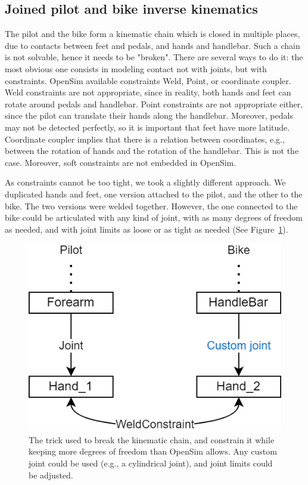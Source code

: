 \subsection{Joined pilot and bike inverse kinematics}
The pilot and the bike form a kinematic chain which is closed in multiple places, due to contacts between feet and pedals, and hands and handlebar. Such a chain is not solvable, hence it needs to be "broken". There are several ways to do it: the most obvious one consists in modeling contact not with joints, but with constraints. OpenSim available constraints Weld, Point, or coordinate coupler. Weld constraints are not appropriate, since in reality, both hands and feet can rotate around pedals and handlebar. Point constraints are not appropriate either, since the pilot can translate their hands along the handlebar. Moreover, pedals may not be detected perfectly, so it is important that feet have more latitude. Coordinate coupler implies that there is a relation between coordinates, e.g., between the rotation of hands and the rotation of the handlebar. This is not the case. Moreover, soft constraints are not embedded in OpenSim. 

As constraints cannot be too tight, we took a slightly different approach. We duplicated hands and feet, one version attached to the pilot, and the other to the bike. The two versions were welded together. However, the one connected to the bike could be articulated with any kind of joint, with as many degrees of freedom as needed, and with joint limits as loose or as tight as needed (See Figure~\ref{fig_bikepilotchain}). 

\begin{figure}[hbtp]
	\centering
	\def\svgwidth{1\columnwidth}
	\fontsize{10pt}{10pt}\selectfont
	\includegraphics[width=0.4\linewidth]{"../Chap7/Figures/bikepilotChain.png"}
	\caption{The trick used to break the kinematic chain, and constrain it while keeping more degrees of freedom than OpenSim allows. Any custom joint could be used (e.g., a cylindrical joint), and joint limits could be adjusted.}
	\label{fig_bikepilotchain}
\end{figure}

